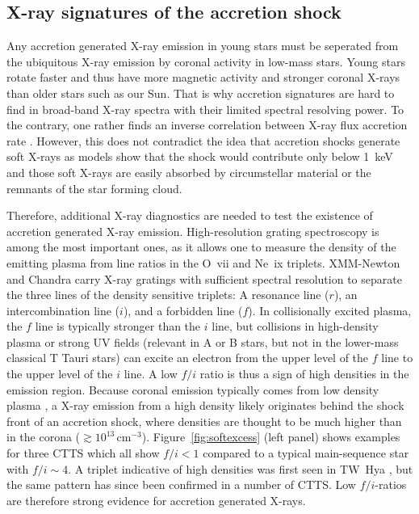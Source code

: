 \subsection{X-ray signatures of the accretion shock}
\label{sect:accretionobs}
Any accretion generated X-ray emission in young stars must be seperated from the ubiquitous X-ray emission by coronal activity in low-mass stars. Young stars rotate faster and thus have more magnetic activity and stronger coronal X-rays than older stars such as our Sun. That is why accretion signatures are hard to find in broad-band X-ray spectra  with their limited spectral resolving power. To the contrary, one rather finds an inverse correlation between X-ray flux  accretion rate \cite{2005ApJS..160..401P, Schneider_2018}. However, this does not contradict the idea that accretion shocks generate soft X-rays as models show that the shock would contribute only below 1~keV \cite{1999AstL...25..430L} and those soft X-rays are easily absorbed by circumstellar material or the remnants of the star forming cloud.

Therefore, additional X-ray diagnostics are needed to test the existence of accretion generated X-ray emission. High-resolution grating spectroscopy is among the most important ones, as it allows one to measure the density of the emitting plasma  from line ratios in the O~{\sc vii} and Ne~{\sc ix} triplets. XMM-Newton and Chandra carry X-ray gratings with sufficient spectral resolution to separate the three lines of the density sensitive triplets: A resonance line ($r$), an intercombination line ($i$), and a forbidden line ($f$). In collisionally excited plasma, the $f$ line is typically stronger than the $i$ line, but collisions in high-density plasma or strong UV fields (relevant in A or B stars, but not in the lower-mass classical T Tauri stars) can excite an electron from the upper level of the $f$ line to the upper level of the $i$ line. A low $f/i$ ratio is thus a sign of high densities in the emission region. Because coronal emission typically comes from low density plasma \citep[$n_e\lesssim10^{10}$\,cm$^{-3}$, e.g.,][]{Ness_2002}, a X-ray emission from a high density likely originates behind the shock front of an accretion shock, where densities are thought to be much higher than in the corona ($\gtrsim10^{13}$\,cm$^{-3}$). Figure~\ref{fig:softexcess} (left panel) shows examples for three CTTS which all show $f/i < 1$ compared to a typical main-sequence star with $f/i\sim 4$. A triplet indicative of high densities was first seen in TW~Hya \cite{Kastner_2002}, but the same pattern has since been confirmed in a number of CTTS. Low $f/i$-ratios are therefore strong evidence for accretion generated X-rays.

